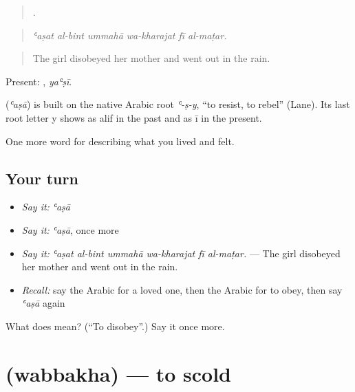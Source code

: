 \begin{quote}
     .
\end{quote}

\begin{quote}
\emph{ʿaṣat al-bint ummahā wa-kharajat fī al-maṭar.}
\end{quote}

\begin{quote}
The girl disobeyed her mother and went out in the rain.
\end{quote}

Present: , \emph{yaʿṣī}.

\begin{cousinweb}
\textbf{} (\emph{ʿaṣā}) is built on the native Arabic root \emph{ʿ-ṣ-y}, \textquotedblleft{}to resist, to rebel\textquotedblright{} (Lane). Its last root letter y shows as alif in the past and as ī in the present.
\end{cousinweb}

\begin{grammarlens}[title={What you've built}]
One more word for describing what you lived and felt.
\end{grammarlens}

\subsection*{Your turn}
\begin{itemize}
\raggedright
  \item \emph{Say it:} \emph{ʿaṣā}
  \item \emph{Say it:} \emph{ʿaṣā}, once more
  \item \emph{Say it:} \emph{ʿaṣat al-bint ummahā wa-kharajat fī al-maṭar.} — The girl disobeyed her mother and went out in the rain.
  \item \emph{Recall:} say the Arabic for a loved one, then the Arabic for to obey, then say \emph{ʿaṣā} again
\end{itemize}

\begin{tcolorbox}[breakable,colback=teal!4,colframe=teal!35!black,title={Before you move on}]
What does  mean? (\textquotedblleft{}To disobey\textquotedblright{}.) Say it once more.
\end{tcolorbox}
\section[\texorpdfstring{\ar{وبخ} (wabbakha)}{وبخ (wabbakha)}]{ (wabbakha) — to scold}

